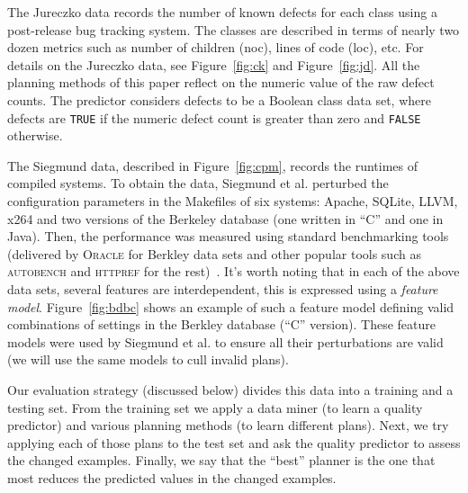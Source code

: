 \documentclass{sig-alternate}
\newcommand{\fig}[1]{Figure~\ref{fig:#1}}
\begin{document}
  
  
   The Jureczko data records the number of known defects for each class using a post-release bug tracking system. The classes are described in terms of
  nearly two dozen metrics such as number of children (noc), lines of code (loc), etc. For details on the Jureczko data, see  \fig{ck} and \fig{jd}. 
 All the planning methods of this paper reflect on the numeric value of the raw defect counts. The predictor considers defects to be a Boolean class data set, where defects are \texttt{TRUE} if the numeric defect count is greater than zero and \texttt{FALSE} otherwise.

  The Siegmund data, described in \fig{cpm},  records  the runtimes of compiled systems. To obtain the  data, Siegmund et al. perturbed
  the configuration parameters in the Makefiles of six systems: Apache, SQLite, LLVM, x264 and two versions of the
  Berkeley database (one written in ``C'' and one in Java). Then, the performance was measured using standard benchmarking tools (delivered by \textsc{Oracle} for Berkley data sets and other popular tools such as \textsc{autobench} and \textsc{httpref} for the rest)~\cite{sven12}. It's worth noting that in each of the above data sets, several features are interdependent, this is expressed using a \textit{feature model}.
   \fig{bdbc} shows an example of such a feature model defining valid combinations of settings in the Berkley database (``C'' version). These feature models were used by Siegmund et al. to ensure all their perturbations are valid
   (we will use the same models to cull invalid plans).
  


  Our evaluation strategy (discussed below) divides this data into a training and a testing set.
  From the training set we apply a data miner (to learn a quality predictor) and
  various planning methods (to learn different plans). Next, we try applying
  each of those plans to the  test set and ask the quality predictor to assess the changed examples.
  Finally, we say that the  ``best'' planner is the one that most reduces the predicted values
  in the changed examples.
  
\end{document}
